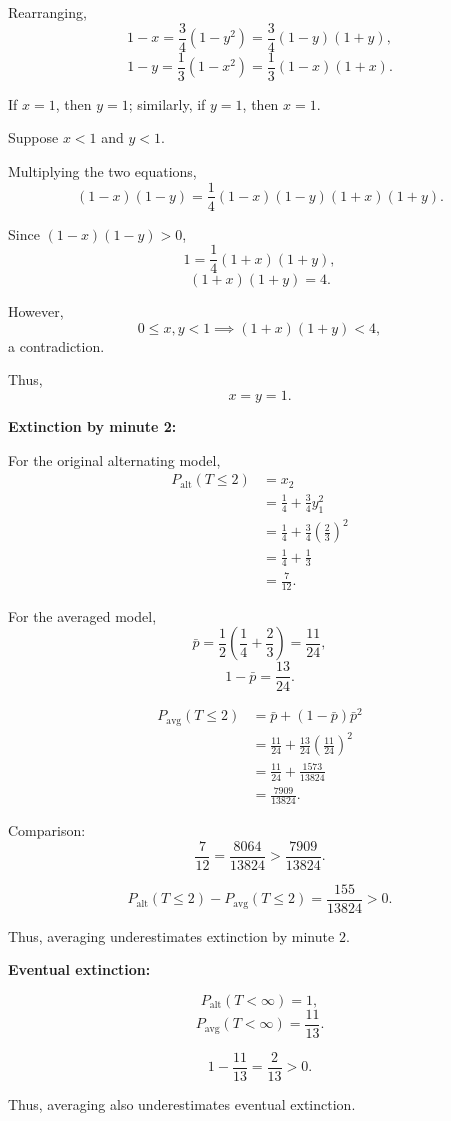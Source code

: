 \documentclass[11pt,a4paper]{article}
\begin{document}
\begin{enumerate}
Rearranging,
\[
1-x=\frac34(1-y^2)
=\frac34(1-y)(1+y),
\]
\[
1-y=\frac13(1-x^2)
=\frac13(1-x)(1+x).
\]

If $x=1$, then $y=1$; similarly,
if $y=1$, then $x=1$.

Suppose $x<1$ and $y<1$.

Multiplying the two equations,
\[
(1-x)(1-y)
=\frac14(1-x)(1-y)(1+x)(1+y).
\]

Since $(1-x)(1-y)>0$,
\[
1=\frac14(1+x)(1+y),
\]
\[
(1+x)(1+y)=4.
\]

However,
\[
0\leq x,y<1
\implies
(1+x)(1+y)<4,
\]
a contradiction.

Thus,
\[
x=y=1.
\]

\medskip
\noindent\textbf{Extinction by minute 2:}

For the original alternating model,
\[
\begin{aligned}
P_{\mathrm{alt}}(T\leq2)
&=x_2\\
&=\frac14+\frac34y_1^2\\
&=\frac14+\frac34\left(\frac23\right)^2\\
&=\frac14+\frac13\\
&=\frac7{12}.
\end{aligned}
\]

For the averaged model,
\[
\bar p
=\frac12\left(\frac14+\frac23\right)
=\frac{11}{24},
\]
\[
1-\bar p=\frac{13}{24}.
\]

\[
\begin{aligned}
P_{\mathrm{avg}}(T\leq2)
&=\bar p+(1-\bar p)\bar p^2\\
&=\frac{11}{24}
+\frac{13}{24}\left(\frac{11}{24}\right)^2\\
&=\frac{11}{24}+\frac{1573}{13824}\\
&=\frac{7909}{13824}.
\end{aligned}
\]

Comparison:
\[
\frac7{12}
=\frac{8064}{13824}
>\frac{7909}{13824}.
\]

\[
P_{\mathrm{alt}}(T\leq2)
-P_{\mathrm{avg}}(T\leq2)
=\frac{155}{13824}>0.
\]

Thus, averaging underestimates extinction by minute $2$.

\medskip
\noindent\textbf{Eventual extinction:}

\[
P_{\mathrm{alt}}(T<\infty)=1,
\]
\[
P_{\mathrm{avg}}(T<\infty)=\frac{11}{13}.
\]

\[
1-\frac{11}{13}=\frac2{13}>0.
\]

Thus, averaging also underestimates eventual extinction.


\end{enumerate}
\end{document}
